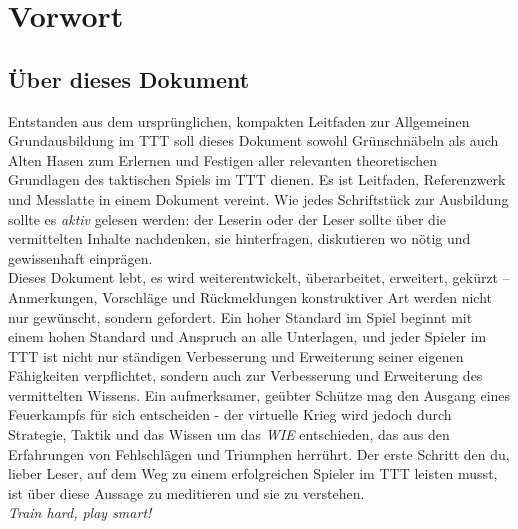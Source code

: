 \section*{Vorwort}
\subsection*{Über dieses Dokument}
	Entstanden aus dem ursprünglichen, kompakten Leitfaden zur Allgemeinen Grundausbildung im \ac{TTT} soll dieses Dokument sowohl Grünschnäbeln als auch Alten Hasen zum Erlernen und Festigen aller relevanten theoretischen Grundlagen des taktischen Spiels im \ac{TTT} dienen. Es ist Leitfaden, Referenzwerk und 		Messlatte in einem Dokument vereint. Wie jedes Schriftstück zur Ausbildung sollte es \textit{aktiv} gelesen werden: der Leserin oder der Leser sollte über die vermittelten Inhalte nachdenken, sie hinterfragen, diskutieren wo nötig und gewissenhaft einprägen.\\
	Dieses Dokument lebt, es wird weiterentwickelt, überarbeitet, erweitert, gekürzt -- Anmerkungen, Vorschläge und Rückmeldungen konstruktiver Art werden nicht nur gewünscht, sondern gefordert. Ein hoher Standard im Spiel beginnt mit einem hohen Standard und Anspruch an alle Unterlagen, und jeder Spieler im \ac{TTT} ist nicht nur ständigen Verbesserung und Erweiterung seiner eigenen Fähigkeiten verpflichtet, sondern auch zur Verbesserung und Erweiterung des vermittelten Wissens. Ein aufmerksamer, geübter Schütze mag den Ausgang eines Feuerkampfs für sich entscheiden - der virtuelle Krieg wird jedoch durch Strategie, Taktik und das Wissen um das \textit{WIE} entschieden, das aus den Erfahrungen von Fehlschlägen und Triumphen herrührt. Der erste Schritt den du, lieber Leser, auf dem Weg zu einem erfolgreichen Spieler im \ac{TTT} leisten musst, ist über diese Aussage zu meditieren und sie zu verstehen.\\

\textit{Train hard, play smart!}

\newpage
